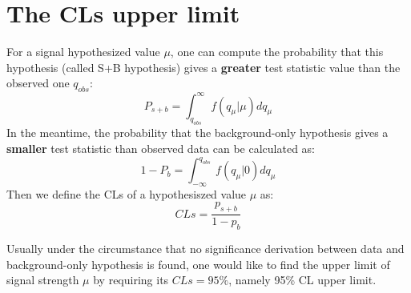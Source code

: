 \section{The CLs upper limit}

For a signal hypothesized value $\mu$, one can compute the probability that this hypothesis (called S+B hypothesis) gives a \textbf{greater} test statistic value than the observed one $q_{obs}$:
\begin{equation}
    P_{s+b} = \int_{q_{obs}}^{\infty} f(q_{\mu}|\mu) d q_{\mu}
\end{equation}
In the meantime, the probability that the background-only hypothesis gives a \textbf{smaller} test statistic than observed data can be calculated as:
\begin{equation}
    1 - P_{b} = \int_{-\infty}^{q_{obs}} f(q_{\mu}|0) d q_{\mu}
\end{equation}
Then we define the CLs of a hypothesiszed value $\mu$ as:
\begin{equation}
    CLs = \frac{p_{s+b}}{1-p_{b}}
\end{equation}

Usually under the circumstance that no significance derivation between data and background-only hypothesis is found,
one would like to find the upper limit of signal strength $\mu$ by requiring its $CLs = 95\%$, namely 95\% CL upper limit. 
